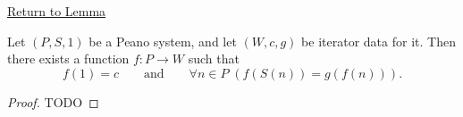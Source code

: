 \newpage
{}
\label{prf:existence-of-iterator-function}

\begin{remark*}[Return]
\hyperref[lem:existence-of-iterator-function]{Return to Lemma}
\end{remark*}

\begin{theorem*}
Let $(P,S,1)$ be a Peano system, and let $(W,c,g)$ be iterator data for it.
Then there exists a function $f:P\to W$ such that
\[
f(1)=c
\qquad\text{and}\qquad
\forall n\in P\;(f(S(n))=g(f(n))).
\]
\end{theorem*}

\begin{proof}
TODO
\end{proof}
